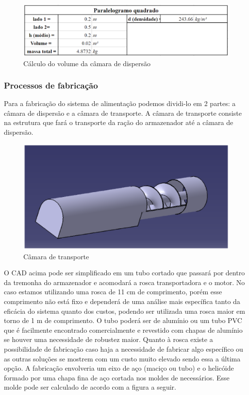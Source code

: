 \begin{figure}[H]
 \centering
   \includegraphics[keepaspectratio=true,scale=0.8]{figuras/quadro_parelolo.eps}
 \caption{Cálculo do volume da câmara de dispersão}
 \label{quadro_parelolo}
\end{figure}

\subsubsection{Processos de fabricação}

Para a fabricação do sistema de alimentação podemos dividi-lo em 2 partes: a câmara de dispersão e a câmara de transporte. A câmara de transporte consiste na estrutura que fará o transporte da ração do armazenador até a câmara de dispersão.

\begin{figure}[H]
 \centering
   \includegraphics[keepaspectratio=true,scale=0.8]{figuras/camara_transporte.eps}
 \caption{Câmara de transporte}
 \label{camara_transporte}
\end{figure}

O CAD acima pode ser simplificado em um tubo cortado que passará por dentro da tremonha do armazenador e acomodará a rosca transportadora e o motor. No caso estamos utilizando uma rosca de 11 cm de comprimento, porém esse comprimento não está fixo e dependerá de uma análise mais específica tanto da eficácia do sistema quanto dos custos, podendo ser utilizada uma rosca maior em torno de 1 m de comprimento. O tubo poderá ser de alumínio ou um tubo PVC que é facilmente encontrado comercialmente e revestido com chapas de alumínio se houver uma necessidade de robustez maior. Quanto à rosca existe a possibilidade de fabricação caso haja a necessidade de fabricar algo específico ou as outras soluções se mostrem com  um custo muito elevado sendo essa a última opção. A fabricação envolveria um eixo de aço (maciço ou tubo) e o helicóide formado por uma chapa fina de aço cortada nos moldes de necessários. Esse molde pode ser calculado de acordo com a figura a seguir.

